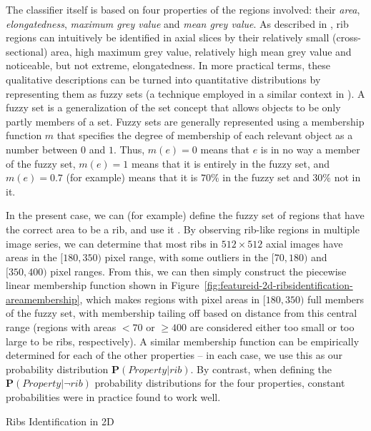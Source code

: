 \noindent The classifier itself is based on four properties of the regions involved: their \emph{area}, \emph{elongatedness}, \emph{maximum grey value} and \emph{mean grey value}. As described in \cite{gvccimi08}, rib regions can intuitively be identified in axial slices by their relatively small (cross-sectional) area, high maximum grey value, relatively high mean grey value and noticeable, but not extreme, elongatedness. In more practical terms, these qualitative descriptions can be turned into quantitative distributions by representing them as fuzzy sets (a technique employed in a similar context in \cite{lee03}). A fuzzy set is a generalization of the set concept that allows objects to be only partly members of a set. Fuzzy sets are generally represented using a membership function $m$ that specifies the degree of membership of each relevant object as a number between $0$ and $1$. Thus, $m(e) = 0$ means that $e$ is in no way a member of the fuzzy set, $m(e) = 1$ means that it is entirely in the fuzzy set, and $m(e) = 0.7$ (for example) means that it is $70\%$ in the fuzzy set and $30\%$ not in it.

In the present case, we can (for example) define the fuzzy set of regions that have the correct area to be a rib, and use it . By observing rib-like regions in multiple image series, we can determine that most ribs in $512 \times 512$ axial images have areas in the $[180,350)$ pixel range, with some outliers in the $[70,180)$ and $[350,400)$ pixel ranges. From this, we can then simply construct the piecewise linear membership function shown in Figure~\ref{fig:featureid-2d-ribsidentification-areamembership}, which makes regions with pixel areas in $[180,350)$ full members of the fuzzy set, with membership tailing off based on distance from this central range (regions with areas $< 70$ or $\ge 400$ are considered either too small or too large to be ribs, respectively). A similar membership function can be empirically determined for each of the other properties -- in each case, we use this as our probability distribution $\mathbf{P}(\mathit{Property} | \mathit{rib})$. By contrast, when defining the $\mathbf{P}(\mathit{Property} | \neg\mathit{rib})$ probability distributions for the four properties, constant probabilities were in practice found to work well.

\begin{stulisting}[p]
\caption{Ribs Identification in 2D}
\label{code:featureid-2d-ribsidentification}

\end{stulisting}

